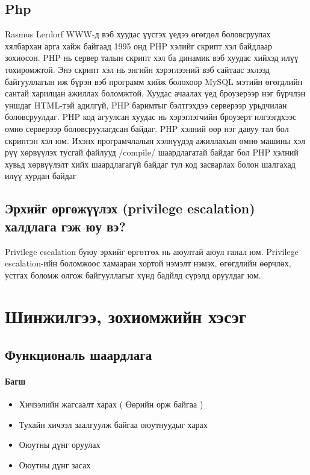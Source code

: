 \documentclass[
oneside, %
english, %
onehalfspacing, %
nolistspacing, %
headsepline, %
]{article} %
\begin{document}
	\subsection{Php}
	Rasmus Lerdorf WWW-д вэб хуудас үүсгэх үедээ өгөгдөл боловсруулах хялбархан арга хайж байгаад 1995 онд PHP хэлийг скрипт хэл байдлаар зохиосон.
	PHP нь сервер талын скрипт хэл ба динамик вэб хуудас хийхэд илүү тохиромжтой. Энэ скрипт хэл нь энгийн хэрэглээний вэб сайтаас эхлээд байгууллагын иж бүрэн вэб программ хийж болохоор MySQL мэтийн өгөгдлийн сантай харилцан ажиллах боломжтой.
	Хуудас ачаалах үед броузерээр нэг бүрчлэн уншдаг HTML-тэй адилгүй, PHP баримтыг бэлтгэхдээ серверээр урьдчилан боловсруулдаг. PHP код агуулсан хуудас нь хэрэглэгчийн броузерт илгээгдхээс өмнө серверээр боловсруулагдсан байдаг.
	PHP хэлний өөр нэг давуу тал бол скриптэн хэл юм. Ихэнх програмчлалын хэлнүүдэд ажиллахын өмнө машины хэл рүү хөрвүүлэх тусгай файлууд /compile/ шаардлагатай байдаг бол PHP хэлний хувьд хөрвүүлэлт хийх шаардлагагүй байдаг тул код засварлах болон шалгахад илүү хурдан байдаг
		
		\subsection{Эрхийг өргөжүүлэх (privilege escalation) халдлага гэж юу вэ? }	
		Privilege escalation буюу эрхийг өргөтгөх нь аюултай аюул ганал юм. 
		Privilege escalation-ийн боломжоос хамааран хортой нэмэлт нэмэх, өгөгдлийн өөрчлөх, устгах боломж олгож байгууллагыг хүнд бадйлд сүрэлд оруулдаг юм.
		
		
	\newpage
	\section{Шинжилгээ, зохиомжийн хэсэг}
	\subsection{Функциональ шаардлага}
	\paragraph {Багш}
     \begin{itemize}
 	
 	\item Хичээлийн жагсаалт харах ( Өөрийн орж байгаа )
 	\item Тухайн хичээл заалгуулж байгаа оюутнуудыг харах
 	\item Оюутны дүнг оруулах
 	\item Оюутны дүнг засах
 
 	
    \end{itemize}
\end{document}
